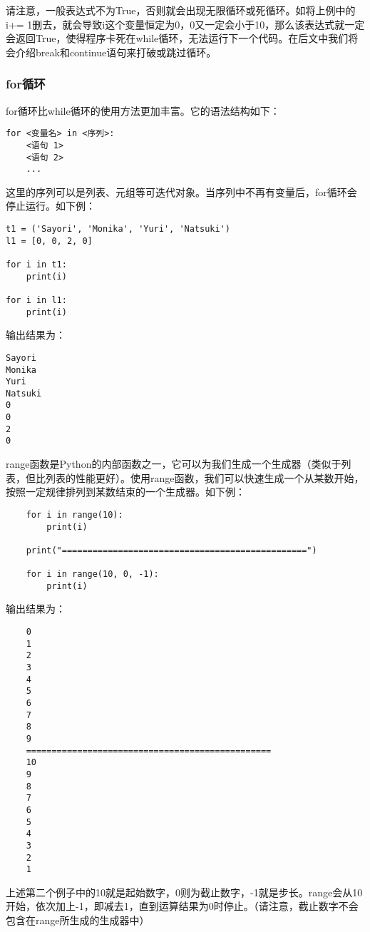 \begin{Warning}
    请注意，一般表达式不为True，否则就会出现无限循环或死循环。如将上例中的i+= 1删去，就会导致i这个变量恒定为0，0又一定会小于10，那么该表达式就一定会返回True，使得程序卡死在while循环，无法运行下一个代码。在后文中我们将会介绍break和continue语句来打破或跳过循环。
\end{Warning}

\subsubsection{for循环\PyOnly }
for循环比while循环的使用方法更加丰富。它的语法结构如下：
\begin{lstlisting}
for <变量名> in <序列>:
    <语句 1>
    <语句 2>
    ...
\end{lstlisting}

这里的序列可以是列表、元组等可迭代对象。当序列中不再有变量后，for循环会停止运行。如下例：

\begin{lstlisting}
t1 = ('Sayori', 'Monika', 'Yuri', 'Natsuki')
l1 = [0, 0, 2, 0]

for i in t1:
    print(i)

for i in l1:
    print(i)
\end{lstlisting}

输出结果为：
\begin{lstlisting}
Sayori
Monika
Yuri
Natsuki
0
0
2
0
\end{lstlisting}

\begin{ExtraKnowledge}
    range函数是Python的内部函数之一，它可以为我们生成一个生成器（类似于列表，但比列表的性能更好）。使用range函数，我们可以快速生成一个从某数开始，按照一定规律排列到某数结束的一个生成器。如下例：
    \begin{lstlisting}
    for i in range(10):
        print(i)

    print("================================================")

    for i in range(10, 0, -1):
        print(i)
    \end{lstlisting}
    输出结果为：
    \begin{lstlisting}
    0
    1
    2
    3
    4
    5
    6
    7
    8
    9
    ================================================
    10
    9
    8
    7
    6
    5
    4
    3
    2
    1
    \end{lstlisting}

    上述第二个例子中的10就是起始数字，0则为截止数字，-1就是步长。range会从10开始，依次加上-1，即减去1，直到运算结果为0时停止。（请注意，截止数字不会包含在range所生成的生成器中）
\end{ExtraKnowledge}

